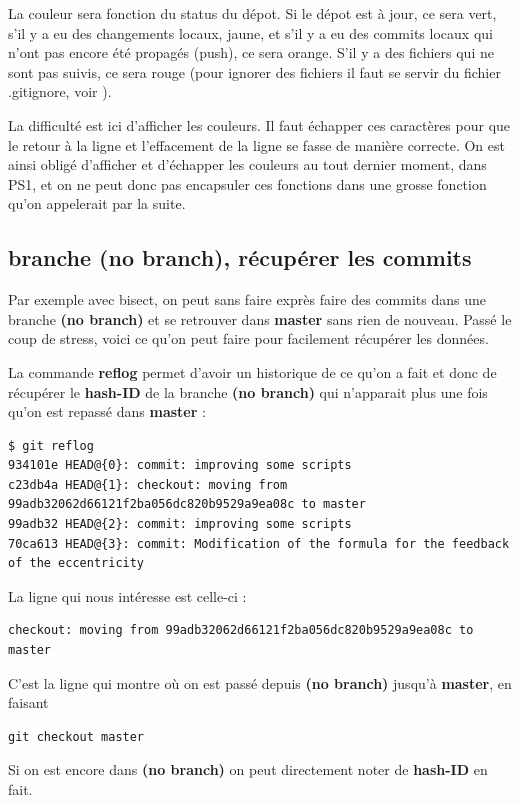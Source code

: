 \documentclass[a4paper,twoside]{article}
\begin{document}
La couleur sera fonction du status du dépot. Si le dépot est à jour, ce sera vert, s'il y a eu des changements locaux, jaune, et s'il y a eu des commits locaux qui n'ont pas encore été propagés (push), ce sera orange. S'il y a des fichiers qui ne sont pas suivis, ce sera rouge (pour ignorer des fichiers il faut se servir du fichier .gitignore, voir ).

\begin{remarque}
La difficulté est ici d'afficher les couleurs. Il faut échapper ces caractères pour que le retour à la ligne et l'effacement de la ligne se fasse de manière correcte. On est ainsi obligé d'afficher et d'échapper les couleurs au tout dernier moment, dans PS1, et on ne peut donc pas encapsuler ces fonctions dans une grosse fonction qu'on appelerait par la suite.
\end{remarque}

\subsection{branche (no branch), récupérer les commits}\label{sec:no-branch}
Par exemple avec bisect, on peut sans faire exprès faire des commits dans une branche \textbf{(no branch)} et se retrouver dans \textbf{master} sans rien de nouveau. Passé le coup de stress, voici ce qu'on peut faire pour facilement récupérer les données. 

La commande \textbf{reflog} permet d'avoir un historique de ce qu'on a fait et donc de récupérer le \textbf{hash-ID} de la branche \textbf{(no branch)} qui n'apparait plus une fois qu'on est repassé dans \textbf{master} : 
\begin{footnotesize}
\begin{verbatim}
$ git reflog
934101e HEAD@{0}: commit: improving some scripts
c23db4a HEAD@{1}: checkout: moving from 99adb32062d66121f2ba056dc820b9529a9ea08c to master
99adb32 HEAD@{2}: commit: improving some scripts
70ca613 HEAD@{3}: commit: Modification of the formula for the feedback of the eccentricity
\end{verbatim}
\end{footnotesize}

La ligne qui nous intéresse est celle-ci :
\begin{verbatim}
checkout: moving from 99adb32062d66121f2ba056dc820b9529a9ea08c to master
\end{verbatim}
C'est la ligne qui montre où on est passé depuis \textbf{(no branch)} jusqu'à \textbf{master}, en faisant 
\begin{verbatim}
git checkout master
\end{verbatim}
\begin{remarque}
Si on est encore dans \textbf{(no branch)} on peut directement noter de \textbf{hash-ID} en fait.
\end{remarque}
\end{document}
